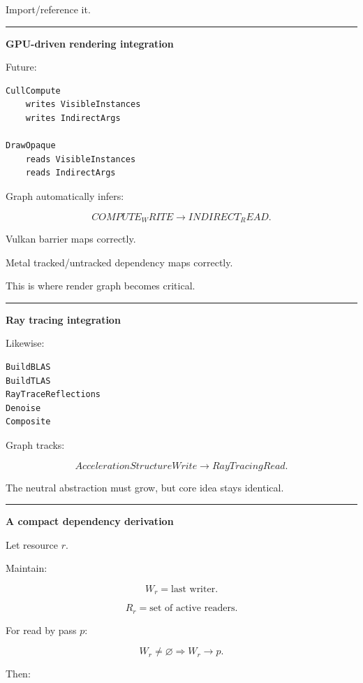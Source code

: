 Import/reference it.

\begin{center}\rule{0.5\linewidth}{0.5pt}\end{center}

\textbf{GPU-driven rendering integration}

Future:

\begin{verbatim}
CullCompute
    writes VisibleInstances
    writes IndirectArgs

DrawOpaque
    reads VisibleInstances
    reads IndirectArgs
\end{verbatim}

Graph automatically infers:

\[
COMPUTE_WRITE
\rightarrow
INDIRECT_READ.
\]

Vulkan barrier maps correctly.

Metal tracked/untracked dependency maps correctly.

This is where render graph becomes critical.

\begin{center}\rule{0.5\linewidth}{0.5pt}\end{center}

\textbf{Ray tracing integration}

Likewise:

\begin{verbatim}
BuildBLAS
BuildTLAS
RayTraceReflections
Denoise
Composite
\end{verbatim}

Graph tracks:

\[
AccelerationStructureWrite
\rightarrow
RayTracingRead.
\]

The neutral abstraction must grow, but core idea stays identical.

\begin{center}\rule{0.5\linewidth}{0.5pt}\end{center}

\textbf{A compact dependency derivation}

Let resource \(r\).

Maintain:

\[
W_r
=
\text{last writer}.
\]

\[
R_r
=
\text{set of active readers}.
\]

For read by pass \(p\):

\[
W_r\neq\varnothing
\Rightarrow
W_r\rightarrow p.
\]

Then:

